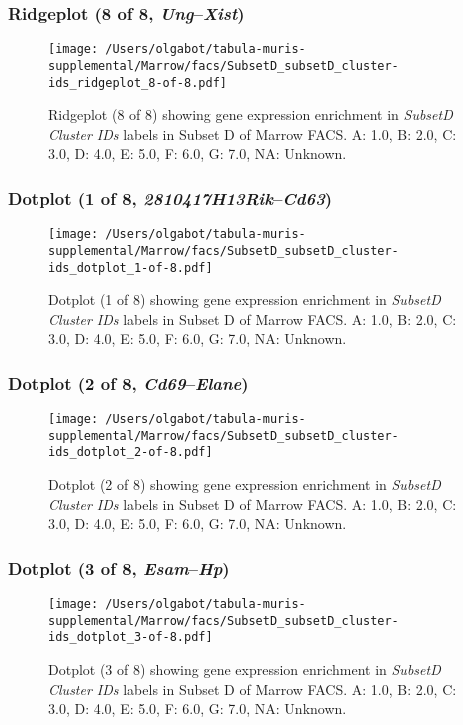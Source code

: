 \clearpage

\subsubsection{Ridgeplot (8 of 8, \emph{Ung}--\emph{Xist})}
\begin{figure}[h]
\centering
\texttt{[image: /Users/olgabot/tabula-muris-supplemental/Marrow/facs/SubsetD\_subsetD\_cluster-ids\_ridgeplot\_8-of-8.pdf]}

\caption{ Ridgeplot (8 of 8)  showing gene expression enrichment in \emph{SubsetD Cluster IDs} labels in Subset D of Marrow FACS. A: 1.0, B: 2.0, C: 3.0, D: 4.0, E: 5.0, F: 6.0, G: 7.0, NA: Unknown.}
\end{figure}


\clearpage

\subsubsection{Dotplot (1 of 8, \emph{2810417H13Rik}--\emph{Cd63})}
\begin{figure}[h]
\centering
\texttt{[image: /Users/olgabot/tabula-muris-supplemental/Marrow/facs/SubsetD\_subsetD\_cluster-ids\_dotplot\_1-of-8.pdf]}

\caption{ Dotplot (1 of 8)  showing gene expression enrichment in \emph{SubsetD Cluster IDs} labels in Subset D of Marrow FACS. A: 1.0, B: 2.0, C: 3.0, D: 4.0, E: 5.0, F: 6.0, G: 7.0, NA: Unknown.}
\end{figure}


\clearpage

\subsubsection{Dotplot (2 of 8, \emph{Cd69}--\emph{Elane})}
\begin{figure}[h]
\centering
\texttt{[image: /Users/olgabot/tabula-muris-supplemental/Marrow/facs/SubsetD\_subsetD\_cluster-ids\_dotplot\_2-of-8.pdf]}

\caption{ Dotplot (2 of 8)  showing gene expression enrichment in \emph{SubsetD Cluster IDs} labels in Subset D of Marrow FACS. A: 1.0, B: 2.0, C: 3.0, D: 4.0, E: 5.0, F: 6.0, G: 7.0, NA: Unknown.}
\end{figure}


\clearpage

\subsubsection{Dotplot (3 of 8, \emph{Esam}--\emph{Hp})}
\begin{figure}[h]
\centering
\texttt{[image: /Users/olgabot/tabula-muris-supplemental/Marrow/facs/SubsetD\_subsetD\_cluster-ids\_dotplot\_3-of-8.pdf]}

\caption{ Dotplot (3 of 8)  showing gene expression enrichment in \emph{SubsetD Cluster IDs} labels in Subset D of Marrow FACS. A: 1.0, B: 2.0, C: 3.0, D: 4.0, E: 5.0, F: 6.0, G: 7.0, NA: Unknown.}
\end{figure}


